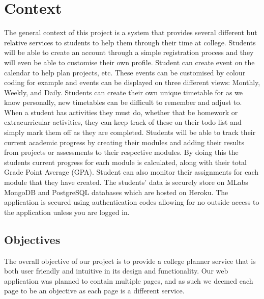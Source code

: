 \chapter{Context}
The general context of this project is a system that provides several different but relative services to students to help them through their time at college. Students will be able to create an account through a simple registration process and they will even be able to customise their own profile. Student can create event on the calendar to help plan projects, etc. These events can be customised by colour coding for example and events can be displayed on three different views: Monthly, Weekly, and Daily. Students can create their own unique timetable for as we know personally, new timetables can be difficult to remember and adjust to. When a student has activities they must do, whether that be homework or extracurricular activities, they can keep track of these on their todo list and simply mark them off as they are completed. Students will be able to track their current academic progress by creating their modules and adding their results from projects or assessments to their respective modules. By doing this the students current progress for each module is calculated, along with their total Grade Point Average (GPA). Student can also monitor their assignments for each module that they have created. The students’ data is securely store on MLabs MongoDB and PostgreSQL databases which are hosted on Heroku. The application is secured using authentication codes allowing for no outside access to the application unless you are logged in.

\section{Objectives}
The overall objective of our project is to provide a college planner service that is both user friendly and intuitive in its design and functionality. Our web application was planned to contain multiple pages, and as such we deemed each page to be an objective as each page is a different service.


